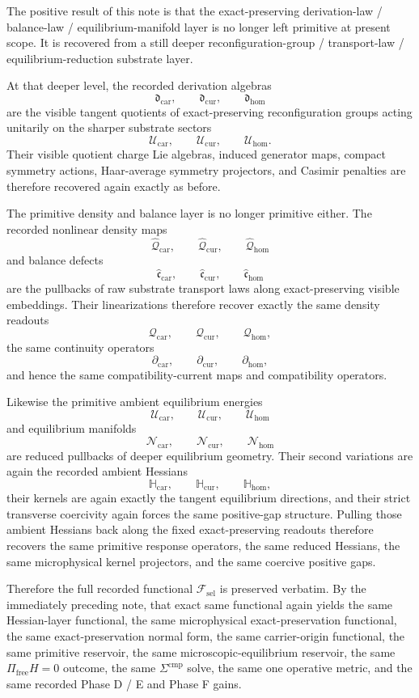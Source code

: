 \documentclass[11pt]{article}
\newcommand{\StemFunctional}{\mathscr F_{\mathrm{sel}}}
\newcommand{\RootTensorClass}{\mathscr U_{\mathrm{car}}}
\newcommand{\RootRelabelClass}{\mathscr U_{\mathrm{cur}}}
\newcommand{\RootFreeClass}{\mathscr U_{\mathrm{hom}}}
\newcommand{\TensorDensity}{\mathcal Q_{\mathrm{car}}}
\newcommand{\CurDensity}{\mathcal Q_{\mathrm{cur}}}
\newcommand{\HomDensity}{\mathcal Q_{\mathrm{hom}}}
\newcommand{\TensorCont}{\partial_{\mathrm{car}}}
\newcommand{\CurCont}{\partial_{\mathrm{cur}}}
\newcommand{\HomCont}{\partial_{\mathrm{hom}}}
\newcommand{\TensorAmbientHess}{\mathbb H_{\mathrm{car}}}
\newcommand{\CurAmbientHess}{\mathbb H_{\mathrm{cur}}}
\newcommand{\HomAmbientHess}{\mathbb H_{\mathrm{hom}}}
\newcommand{\TensorDerAlg}{\mathfrak d_{\mathrm{car}}}
\newcommand{\CurDerAlg}{\mathfrak d_{\mathrm{cur}}}
\newcommand{\HomDerAlg}{\mathfrak d_{\mathrm{hom}}}
\newcommand{\TensorPrimitiveDensity}{\widehat{\mathcal Q}_{\mathrm{car}}}
\newcommand{\CurPrimitiveDensity}{\widehat{\mathcal Q}_{\mathrm{cur}}}
\newcommand{\HomPrimitiveDensity}{\widehat{\mathcal Q}_{\mathrm{hom}}}
\newcommand{\TensorBalance}{\widehat{\mathfrak c}_{\mathrm{car}}}
\newcommand{\CurBalance}{\widehat{\mathfrak c}_{\mathrm{cur}}}
\newcommand{\HomBalance}{\widehat{\mathfrak c}_{\mathrm{hom}}}
\newcommand{\TensorAmbientEnergy}{\mathcal U_{\mathrm{car}}}
\newcommand{\CurAmbientEnergy}{\mathcal U_{\mathrm{cur}}}
\newcommand{\HomAmbientEnergy}{\mathcal U_{\mathrm{hom}}}
\newcommand{\TensorEqManifold}{\mathcal N_{\mathrm{car}}}
\newcommand{\CurEqManifold}{\mathcal N_{\mathrm{cur}}}
\newcommand{\HomEqManifold}{\mathcal N_{\mathrm{hom}}}
\begin{document}
The positive result of this note is that the exact-preserving derivation-law / balance-law / equilibrium-manifold layer is no longer left primitive at present scope. It is recovered from a still deeper reconfiguration-group / transport-law / equilibrium-reduction substrate layer.

At that deeper level, the recorded derivation algebras
\[
\TensorDerAlg,\qquad
\CurDerAlg,\qquad
\HomDerAlg
\]
are the visible tangent quotients of exact-preserving reconfiguration groups acting unitarily on the sharper substrate sectors
\[
\RootTensorClass,\qquad
\RootRelabelClass,\qquad
\RootFreeClass.
\]
Their visible quotient charge Lie algebras, induced generator maps, compact symmetry actions, Haar-average symmetry projectors, and Casimir penalties are therefore recovered again exactly as before.

The primitive density and balance layer is no longer primitive either. The recorded nonlinear density maps
\[
\TensorPrimitiveDensity,\qquad
\CurPrimitiveDensity,\qquad
\HomPrimitiveDensity
\]
and balance defects
\[
\TensorBalance,\qquad
\CurBalance,\qquad
\HomBalance
\]
are the pullbacks of raw substrate transport laws along exact-preserving visible embeddings. Their linearizations therefore recover exactly the same density readouts
\[
\TensorDensity,\qquad
\CurDensity,\qquad
\HomDensity,
\]
the same continuity operators
\[
\TensorCont,\qquad
\CurCont,\qquad
\HomCont,
\]
and hence the same compatibility-current maps and compatibility operators.

Likewise the primitive ambient equilibrium energies
\[
\TensorAmbientEnergy,\qquad
\CurAmbientEnergy,\qquad
\HomAmbientEnergy
\]
and equilibrium manifolds
\[
\TensorEqManifold,\qquad
\CurEqManifold,\qquad
\HomEqManifold
\]
are reduced pullbacks of deeper equilibrium geometry. Their second variations are again the recorded ambient Hessians
\[
\TensorAmbientHess,\qquad
\CurAmbientHess,\qquad
\HomAmbientHess,
\]
their kernels are again exactly the tangent equilibrium directions, and their strict transverse coercivity again forces the same positive-gap structure. Pulling those ambient Hessians back along the fixed exact-preserving readouts therefore recovers the same primitive response operators, the same reduced Hessians, the same microphysical kernel projectors, and the same coercive positive gaps.

Therefore the full recorded functional \(\StemFunctional\) is preserved verbatim. By the immediately preceding note, that exact same functional again yields the same Hessian-layer functional, the same microphysical exact-preservation functional, the same exact-preservation normal form, the same carrier-origin functional, the same primitive reservoir, the same microscopic-equilibrium reservoir, the same \(\Pi_{\mathrm{free}}H=0\) outcome, the same \(\Sigma^{\mathrm{cmp}}\) solve, the same one operative metric, and the same recorded Phase D / E and Phase F gains.
\end{document}
